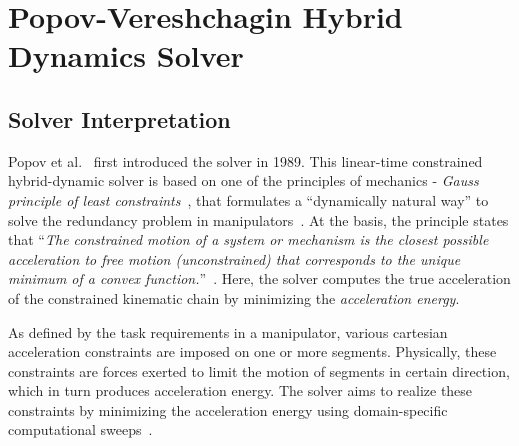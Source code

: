 \chapter{Popov-Vereshchagin Hybrid Dynamics Solver}

\section{Solver Interpretation}
 
 Popov et al.~\cite{vereshchagin1989modeling} first introduced the solver in 1989. This linear-time constrained hybrid-dynamic solver is based on one of the principles of mechanics - \textit{Gauss principle of least constraints}~\cite{vereshchagin1989modeling}, that formulates a ``dynamically natural way'' to solve the redundancy problem in manipulators~\cite{bruyninckx2000gauss}. At the basis, the principle states that ``\textit{The constrained motion of a system or mechanism is the closest possible acceleration to free motion (unconstrained) that corresponds to the unique minimum of a convex function.}''~\cite{Ramm2014}. Here, the solver computes the true acceleration of the constrained kinematic chain by minimizing the \textit{acceleration energy}. 

 As defined by the task requirements in a manipulator, various cartesian acceleration constraints are imposed on one or more segments. Physically, these constraints are forces exerted to limit the motion of segments in certain direction, which in turn produces acceleration energy. The solver aims to realize these constraints by minimizing the acceleration energy using domain-specific computational sweeps~\cite{shakhimardanov2015composable}. 
 
 
 
